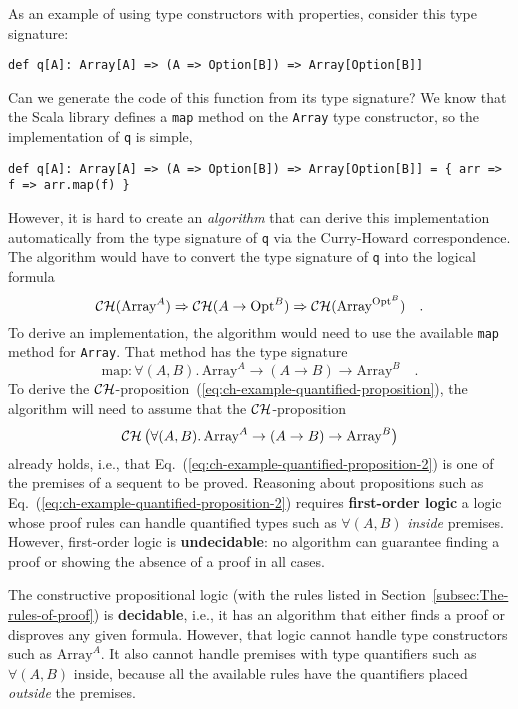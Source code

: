As an example of using type constructors with properties, consider
this type signature:
\begin{lstlisting}
def q[A]: Array[A] => (A => Option[B]) => Array[Option[B]]
\end{lstlisting}
Can we generate the code of this function from its type signature?
We know that the Scala library defines a \lstinline!map! method on
the \lstinline!Array! type constructor, so the implementation of
\lstinline!q! is simple,
\begin{lstlisting}
def q[A]: Array[A] => (A => Option[B]) => Array[Option[B]] = { arr => f => arr.map(f) }
\end{lstlisting}
However, it is hard to create an \emph{algorithm} that can derive
this implementation automatically from the type signature of \lstinline!q!
via the Curry-Howard correspondence. The algorithm would have to convert
the type signature of \lstinline!q! into the logical formula 
\begin{equation}
{\cal CH}(\text{Array}^{A})\Rightarrow{\cal CH}(A\rightarrow\text{Opt}^{B})\Rightarrow{\cal CH}(\text{Array}^{\text{Opt}^{B}})\quad.\label{eq:ch-example-quantified-proposition}
\end{equation}
To derive an implementation, the algorithm would need to use the available
\lstinline!map! method for \lstinline!Array!. That method has the
type signature
\[
\text{map}:\forall(A,B).\,\text{Array}^{A}\rightarrow\left(A\rightarrow B\right)\rightarrow\text{Array}^{B}\quad.
\]
To derive the ${\cal CH}$-proposition~(\ref{eq:ch-example-quantified-proposition}),
the algorithm will need to assume that the ${\cal CH}$-proposition
\begin{equation}
{\cal CH}\,\big(\forall(A,B).\,\text{Array}^{A}\rightarrow\left(A\rightarrow B\right)\rightarrow\text{Array}^{B}\big)\label{eq:ch-example-quantified-proposition-2}
\end{equation}
already holds, i.e., that Eq.~(\ref{eq:ch-example-quantified-proposition-2})
is one of the premises of a sequent to be proved. Reasoning about
propositions such as Eq.~(\ref{eq:ch-example-quantified-proposition-2})
requires \textbf{first-order logic} \textemdash{}
a logic whose proof rules can handle quantified types such as $\forall(A,B)$\emph{
inside} premises. However, first-order logic is \textbf{undecidable}:
no algorithm can guarantee finding a proof or showing the absence
of a proof in all cases. 

The constructive propositional logic (with the rules listed in Section~\ref{subsec:The-rules-of-proof})
is \textbf{decidable}, i.e., it has an algorithm
that either finds a proof or disproves any given formula. However,
that logic cannot handle type constructors such as $\text{Array}^{A}$.
It also cannot handle premises with type quantifiers such as $\forall(A,B)$
inside, because all the available rules have the quantifiers placed
\emph{outside} the premises. 

